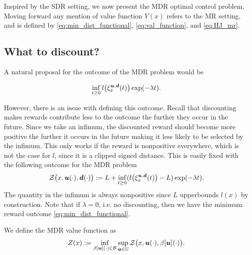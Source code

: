 Inspired by the SDR setting, we now present the MDR optimal control problem. Moving forward any mention of value function $V(x)$ refers to the MR setting, and is defined by \eqref{eq:min_dist_functional}, \eqref{eq:val_function}, and \eqref{eq:HJ_mr}.

\subsection{What to discount?}

A natural proposal for the outcome of the MDR problem would be
 
\begin{equation}
\inf_{t\ge 0}l\big(\xi_{x}^{\bm{u},\bm{d}}(t)\big)\exp(-\lambda  t).
\end{equation}

However, there is an issue with defining this outcome. Recall that discounting makes rewards contribute less to the outcome the further they occur in the future. Since we take an infimum, the discounted reward should become more positive the further it occurs in the future making it less likely to be selected by the infimum. This only works if the reward is nonpositive everywhere, which is not the case for $l$, since it is a clipped signed distance. This is easily fixed with the following outcome for the MDR problem
%
\begin{equation} \label{eq:mdr_functional}
\mathcal{Z}\big(x,\bm{u}(\cdot),\bm{d}(\cdot)\big) := L + \inf_{t\ge 0}(l\big(\xi_{x}^{\bm{u},\bm{d}}(t)\big)-L)\exp(-\lambda  t) .
\end{equation}%
\noindent The quantity in the infimum is always nonpositive since $L$ upperbounds $l(x)$ by construction. Note that if ${\lambda=0}$, i.e. no discounting, then we have the minimum reward outcome \eqref{eq:min_dist_functional}. 

We define the MDR value function as
%
\begin{equation} \label{eq:mdr_val_function}
Z(x):=\inf_{\beta[\bm{u}](\cdot) \in \mathcal{B}} \sup_{\bm{u} \in \mathbb{U}}\mathcal{Z}\big(x,\bm{u}(\cdot),\beta[\bm{u}](\cdot)\big) .
\end{equation}

%

